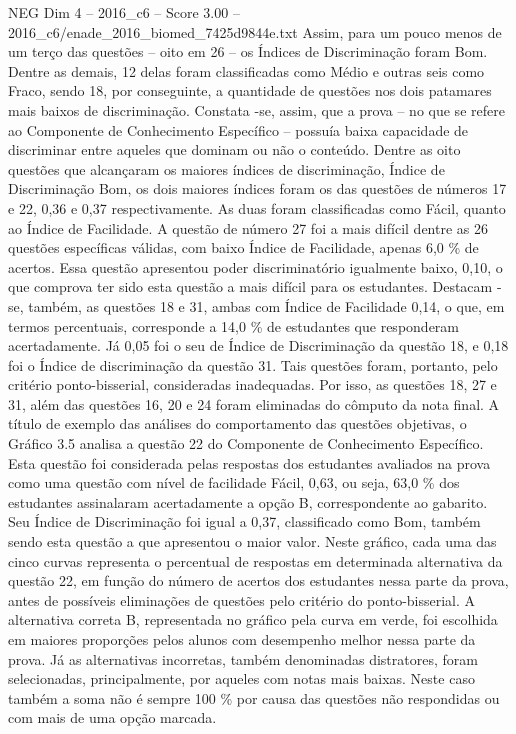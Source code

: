 \begin{textsample}{NEG Dim 4 – 2016\_c6 – Score 3.00 – 2016\_c6/enade\_2016\_biomed\_7425d9844e.txt}
Assim, para um pouco menos de um terço das questões – oito em 26 – os Índices de Discriminação foram Bom.
Dentre as demais, 12 delas foram classificadas como Médio e outras seis como Fraco, sendo 18, por conseguinte, a quantidade de questões nos dois patamares mais baixos de discriminação.
Constata -se, assim, que a prova – no que se refere ao Componente de Conhecimento Específico – possuía baixa capacidade de discriminar entre aqueles que dominam ou não o conteúdo.
Dentre as oito questões que alcançaram os maiores índices de discriminação, Índice de Discriminação Bom, os dois maiores índices foram os das questões de números 17 e 22, 0,36 e 0,37 respectivamente.
As duas foram classificadas como Fácil, quanto ao Índice de Facilidade.
A questão de número 27 foi a mais difícil dentre as 26 questões específicas válidas, com baixo Índice de Facilidade, apenas 6,0 \% de acertos.
Essa questão apresentou poder discriminatório igualmente baixo, 0,10, o que comprova ter sido esta questão a mais difícil para os estudantes.
Destacam -se, também, as questões 18 e 31, ambas com Índice de Facilidade 0,14, o que, em termos percentuais, corresponde a 14,0 \% de estudantes que responderam acertadamente.
Já 0,05 foi o seu de Índice de Discriminação da questão 18, e 0,18 foi o Índice de discriminação da questão 31.
Tais questões foram, portanto, pelo critério ponto-bisserial, consideradas inadequadas.
Por isso, as questões 18, 27 e 31, além das questões 16, 20 e 24 foram eliminadas do cômputo da nota final.
A título de exemplo das análises do comportamento das questões objetivas, o Gráfico 3.5 analisa a questão 22 do Componente de Conhecimento Específico.
Esta questão foi considerada pelas respostas dos estudantes avaliados na prova como uma questão com nível de facilidade Fácil, 0,63, ou seja, 63,0 \% dos estudantes assinalaram acertadamente a opção B, correspondente ao gabarito.
Seu Índice de Discriminação foi igual a 0,37, classificado como Bom, também sendo esta questão a que apresentou o maior valor.
Neste gráfico, cada uma das cinco curvas representa o percentual de respostas em determinada alternativa da questão 22, em função do número de acertos dos estudantes nessa parte da prova, antes de possíveis eliminações de questões pelo critério do ponto-bisserial.
A alternativa correta B, representada no gráfico pela curva em verde, foi escolhida em maiores proporções pelos alunos com desempenho melhor nessa parte da prova.
Já as alternativas incorretas, também denominadas distratores, foram selecionadas, principalmente, por aqueles com notas mais baixas.
Neste caso também a soma não é sempre 100 \% por causa das questões não respondidas ou com mais de uma opção marcada.

\end{textsample}
